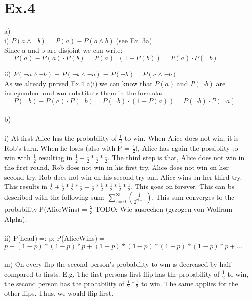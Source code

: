 \documentclass[11pt]{article}
\begin{document}
\section*{Ex.4}

a)\\
i) $P(a \wedge \neg b) = P(a) - P(a \wedge b) $ (see Ex. 3a) \\
Since a and b are disjoint we can write: \\
$ = P(a) - P(a) \cdot P(b) = P(a) \cdot (1 - P(b)) = P(a) \cdot P(\neg b)$ \newline 
\newline

ii) $P(\neg a \wedge \neg b) = P(\neg b \wedge \neg a) = P(\neg b) - P(a \wedge \neg b)$ \\
As we already proved Ex.4 a)i) we can know that $P(a)$ and $P(\neg b)$ are independent and can substitute them in the formula: \\
$= P(\neg b) - P(a) \cdot P(\neg b) = P(\neg b) \cdot (1 - P(a)) = P(\neg b) \cdot P(\neg a)$
\\ \\
\noindent
b)\\
\\
i) At first Alice has the probability of $\frac{1}{2}$ to win. When Alice does not win, it is Rob's turn. When he loses (also with P = $\frac{1}{2}$), Alice has again the possiblity to win with $\frac{1}{2}$ resulting in $\frac{1}{2}+\frac{1}{2}*\frac{1}{2}*\frac{1}{2}$. The third step is that, Alice does not win in the first round, Rob does not win in his first try, Alice does not win on her second try, Rob does not win on his second try and Alice wins on her third try. This results in $\frac{1}{2}+\frac{1}{2}*\frac{1}{2}*\frac{1}{2}+\frac{1}{2}*\frac{1}{2}*\frac{1}{2}*\frac{1}{2}*\frac{1}{2}$. This goes on forever. This can be described with the following sum: $ \sum\nolimits_{i=0}^\infty(\frac{1}{2^{2i-1}})$. This sum converges to the probability P(AliceWins) = $\frac{2}{3}$ TODO: Wie ausrechen (gezogen von Wolfram Alpha).\\
\\
ii) P(head) =: p; P(AliceWins) = $p + (1-p) *(1-p) * p + (1-p) * (1-p) * (1-p) * (1-p) *p + \dots$ \\
\\
iii) On every flip the second person's probability to win is decreased by half compared to firsts. E.g. The first persons first flip has the probability of $\frac{1}{2}$ to win, the second person has the probability of $\frac{1}{2}*\frac{1}{2}$ to win. The same applies for the other flips. Thus, we would flip first.\\
\\
\end{document}
